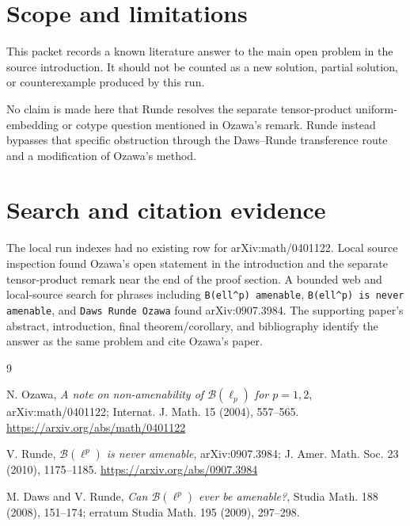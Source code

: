 \documentclass[11pt]{article}
\newcommand{\B}{\mathcal{B}}
\begin{document}
\section*{Scope and limitations}

This packet records a known literature answer to the main open problem in the
source introduction. It should not be counted as a new solution, partial
solution, or counterexample produced by this run.

No claim is made here that Runde resolves the separate tensor-product
uniform-embedding or cotype question mentioned in Ozawa's remark. Runde instead
bypasses that specific obstruction through the Daws--Runde transference route
and a modification of Ozawa's method.

\section*{Search and citation evidence}

The local run indexes had no existing row for arXiv:math/0401122. Local source
inspection found Ozawa's open statement in the introduction and the separate
tensor-product remark near the end of the proof section. A bounded web and
local-source search for phrases including
\texttt{B(ell\^{}p) amenable}, \texttt{B(ell\^{}p) is never amenable}, and
\texttt{Daws Runde Ozawa} found arXiv:0907.3984. The supporting paper's
abstract, introduction, final theorem/corollary, and bibliography identify the
answer as the same problem and cite Ozawa's paper.

\begin{thebibliography}{9}

N. Ozawa,
\emph{A note on non-amenability of $\B(\ell_p)$ for $p=1,2$},
arXiv:math/0401122; Internat. J. Math. 15 (2004), 557--565.
\url{https://arxiv.org/abs/math/0401122}

V. Runde,
\emph{$\B(\ell^p)$ is never amenable},
arXiv:0907.3984; J. Amer. Math. Soc. 23 (2010), 1175--1185.
\url{https://arxiv.org/abs/0907.3984}

M. Daws and V. Runde,
\emph{Can $\B(\ell^p)$ ever be amenable?},
Studia Math. 188 (2008), 151--174; erratum Studia Math. 195 (2009),
297--298.

\end{thebibliography}
\end{document}
